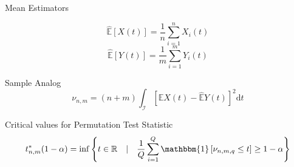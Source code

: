 \documentclass[12pt, a4paper]{article}
\theoremstyle{MAstyle} \newtheorem{assumption}{Assumption}[section]
\theoremstyle{MAstyle} \newtheorem{definition}{Definition}[section]
\theoremstyle{MAstyle} \newtheorem{theorem}{Theorem}[section]
\begin{document}
			Mean Estimators
			\begin{multicols}{2}
				\noindent
				\begin{equation*}
					\hat{\mathbb{E}}\left[X(t)\right] = \frac{1}{n}\sum_{i = 1}^{n} X_i(t)
				\end{equation*}
				\begin{equation}
					\hat{\mathbb{E}}\left[Y(t)\right] = \frac{1}{m}\sum_{i = 1}^{m} Y_i(t)
				\end{equation}
			\end{multicols}
		
			Sample Analog
			\begin{equation}
				\nu_{n,m} = (n+m) \int_{\mathcal{I}} \left[\hat{\mathbb{E}}X(t) - \hat{\mathbb{E}}Y(t)\right]^2 \mathrm{d}t
			\end{equation}
		
			Critical values for Permutation Test Statistic
			\begin{equation}
				t^{*}_{n,m}(1-\alpha) = \inf \left\{t \in \mathbb{R} \quad \vert \quad \frac{1}{Q} \sum_{i = 1}^{Q} \mathbbm{1}\left[\nu_{n,m,q} \leq t\right] \geq 1 - \alpha \right\}
			\end{equation}
		
\end{document}
